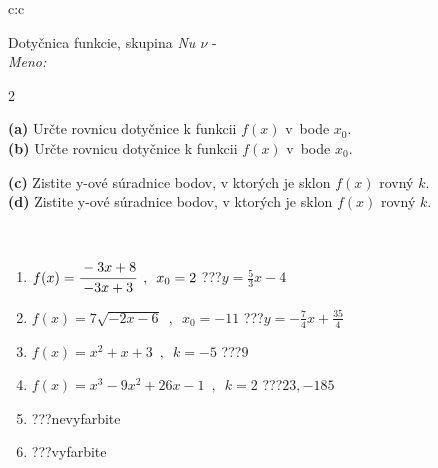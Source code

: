\documentclass[10pt]{report}
\begin{document}
\begin{tabular}{c:c}
\begin{minipage}[c][104.5mm][t]{0.5\linewidth}
\begin{center}
\vspace{7mm}
{\huge Dotyčnica funkcie, skupina \textit{Nu $\nu$} -}\\[5mm]
\textit{Meno:}\phantom{xxxxxxxxxxxxxxxxxxxxxxxxxxxxxxxxxxxxxxxxxxxxxxxxxxxxxxxxxxxxxxxxx}\\[5mm]
\begin{minipage}{0.95\linewidth}
\begin{center}
{\small \begin{multicols}{2} \raggedright
\textbf{(a)} Určte rovnicu dotyčnice k funkcii \(f(x)\) v~bode \(x_0\). \\[1mm]
\textbf{(b)} Určte rovnicu dotyčnice k funkcii \(f(x)\) v~bode \(x_0\). \par \columnbreak
\textbf{(c)} Zistite y-ové súradnice bodov, v ktorých je sklon \(f(x)\) rovný \(k\). \\[1mm]
\textbf{(d)} Zistite y-ové súradnice bodov, v ktorých je sklon \(f(x)\) rovný \(k\). \\[1mm]
\end{multicols}
}
\end{center}
\end{minipage}
\\[4mm]
\begin{minipage}{0.79\linewidth}
\begin{center}
\begin{varwidth}{\linewidth}
\begin{enumerate}
\normalsizerr
\item $f(x)=\cfrac{-3x+8}{-3x+3}\enspace , \enspace x_0=2$\quad \dotfill\; ???\;\dotfill \quad $y = \frac{5}{3}x-4$
\item $f(x)=7\sqrt{-2x-6}\enspace , \enspace x_0=-11$\quad \dotfill\; ???\;\dotfill \quad $y = -\frac{7}{4}x+\frac{35}{4}$
\item $f(x)=x^2+x+3\enspace , \enspace k=-5$\quad \dotfill\; ???\;\dotfill \quad $9$
\item $f(x)=x^3-9x^2+26x-1\enspace , \enspace k=2$\quad \dotfill\; ???\;\dotfill \quad $23 , -185$
\item \quad \dotfill\; ???\;\dotfill \quad nevyfarbite
\item \quad \dotfill\; ???\;\dotfill \quad vyfarbite
\end{enumerate}
\end{varwidth}

\end{center}
\end{minipage}
\end{center}
\end{minipage}
\end{tabular}
\end{document}
